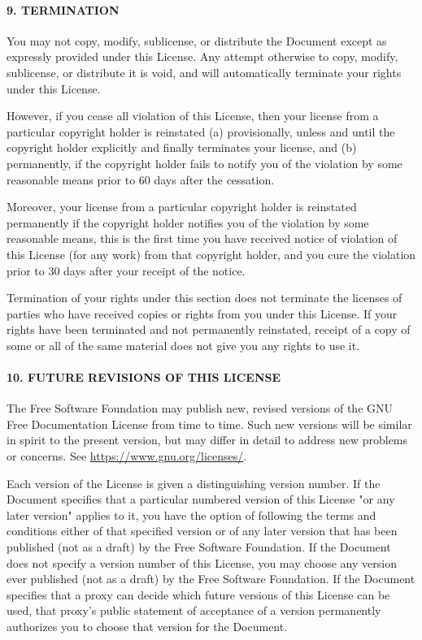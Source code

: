 \hypertarget{9-termination}{%
\paragraph{9. TERMINATION}\label{9-termination}}

You may not copy, modify, sublicense, or distribute the Document except
as expressly provided under this License. Any attempt otherwise to copy,
modify, sublicense, or distribute it is void, and will automatically
terminate your rights under this License.

However, if you cease all violation of this License, then your license
from a particular copyright holder is reinstated (a) provisionally,
unless and until the copyright holder explicitly and finally terminates
your license, and (b) permanently, if the copyright holder fails to
notify you of the violation by some reasonable means prior to 60 days
after the cessation.

Moreover, your license from a particular copyright holder is reinstated
permanently if the copyright holder notifies you of the violation by
some reasonable means, this is the first time you have received notice
of violation of this License (for any work) from that copyright holder,
and you cure the violation prior to 30 days after your receipt of the
notice.

Termination of your rights under this section does not terminate the
licenses of parties who have received copies or rights from you under
this License. If your rights have been terminated and not permanently
reinstated, receipt of a copy of some or all of the same material does
not give you any rights to use it.

\hypertarget{10-future-revisions-of-this-license}{%
\paragraph{10. FUTURE REVISIONS OF THIS
LICENSE}\label{10-future-revisions-of-this-license}}

The Free Software Foundation may publish new, revised versions of the
GNU Free Documentation License from time to time. Such new versions will
be similar in spirit to the present version, but may differ in detail to
address new problems or concerns. See
\url{https://www.gnu.org/licenses/}.

Each version of the License is given a distinguishing version number. If
the Document specifies that a particular numbered version of this
License "or any later version" applies to it, you have the option of
following the terms and conditions either of that specified version or
of any later version that has been published (not as a draft) by the
Free Software Foundation. If the Document does not specify a version
number of this License, you may choose any version ever published (not
as a draft) by the Free Software Foundation. If the Document specifies
that a proxy can decide which future versions of this License can be
used, that proxy's public statement of acceptance of a version
permanently authorizes you to choose that version for the Document.

